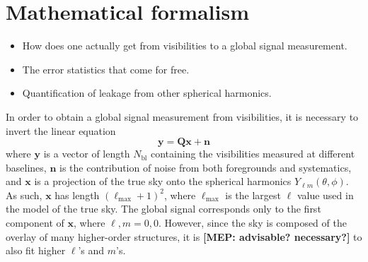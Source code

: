 \documentclass[twolcolumn,apj]{emulateapj}
\newcommand{\y}{\mathbf{y}}
\newcommand{\Q}{\mathbf{Q}}
\newcommand{\Nbl}{N_{\textrm{bl}}}
\newcommand{\acl}[1]{{\color{red} \textbf{[ACL:  #1]}}}
\newcommand{\mep}[1]{{\color{applegreen} \textbf{[MEP:  #1]}}}
\begin{document}
\section{Mathematical formalism}
\begin{itemize}
\item How does one actually get from visibilities to a global signal measurement.
\item The error statistics that come for free.
\item Quantification of leakage from other spherical harmonics.
\end{itemize}

In order to obtain a global signal measurement from visibilities, it is necessary to invert the linear equation 
\begin{equation}
\y = \Q \mathbf{x} + \mathbf{n}
\label{eqn:yQxn}
\end{equation}
where $\y$ is a vector of length $\Nbl$ containing the visibilities measured at different baselines, $\mathbf{n}$ is the contribution of noise from both foregrounds and systematics, and $\mathbf{x}$ is a projection of the true sky onto the spherical harmonics $Y_{\ell m}(\theta,\phi)$. As such, $\mathbf{x}$ has length $(\ell_{\textrm{max}}+1)^2$, where $\ell_{\textrm{max}}$ is the largest $\ell$ value used in the model of the true sky. The global signal corresponds only to the first component of $\mathbf{x}$, where $\ell,m=0,0$. However, since the sky is composed of the overlay of many higher-order structures, it is \mep{advisable? necessary?} to also fit higher $\ell$'s and $m$'s. 
\end{document}
